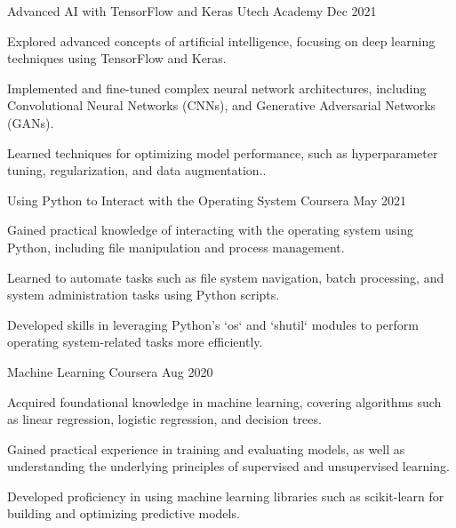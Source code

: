 \begin{cventries}
	\cventry
	{Advanced AI with TensorFlow and Keras} %
	{Utech Academy} %
	{\textcolor{neutraltext}{Dec 2021}} %
	{} %
	{
		\begin{cvitems} %
			\item Explored advanced concepts of artificial intelligence, focusing on deep learning techniques using TensorFlow and Keras.
			\item Implemented and fine-tuned complex neural network architectures, including Convolutional Neural Networks (CNNs), and Generative Adversarial Networks (GANs).
			\item Learned techniques for optimizing model performance, such as hyperparameter tuning, regularization, and data augmentation..
		\end{cvitems}
	}
	
	
	\cventry
	{Using Python to Interact with the Operating System} %
	{Coursera} %
	{\textcolor{neutraltext}{May 2021}} %
	{} %
	{
		\begin{cvitems} %
			\item Gained practical knowledge of interacting with the operating system using Python, including file manipulation and process management.
			\item Learned to automate tasks such as file system navigation, batch processing, and system administration tasks using Python scripts.
			\item Developed skills in leveraging Python's `os` and `shutil` modules to perform operating system-related tasks more efficiently.
		\end{cvitems}
	}
	
	\cventry
	{Machine Learning} %
	{Coursera} %
	{\textcolor{neutraltext}{Aug 2020}} %
	{} %
	{
		\begin{cvitems} %
			\item Acquired foundational knowledge in machine learning, covering algorithms such as linear regression, logistic regression, and decision trees.
			\item Gained practical experience in training and evaluating models, as well as understanding the underlying principles of supervised and unsupervised learning.
			\item Developed proficiency in using machine learning libraries such as scikit-learn for building and optimizing predictive models.
		\end{cvitems}
	}
	

\end{cventries}
